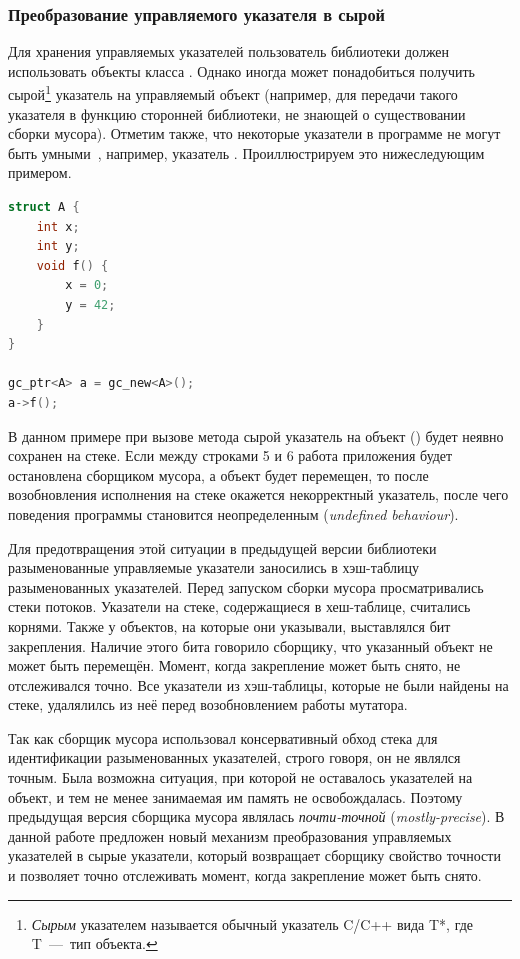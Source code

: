 \subsubsection{Преобразование управляемого указателя в сырой}
Для хранения управляемых указателей пользователь библиотеки должен использовать объекты 
класса . 
Однако иногда может понадобиться получить сырой\footnote{\emph{Сырым} 
указателем называется обычный указатель C/C++ вида T*, 
где T~---~тип объекта.} 
указатель на управляемый объект (например, для передачи такого указателя 
в функцию сторонней библиотеки, 
не знающей о существовании сборки мусора). 
Отметим также, что некоторые указатели в программе не могут быть 
умными~\cite{book:jones1996garbage}, например, указатель . 
Проиллюстрируем это нижеследующим примером.

\begin{minipage}{\linewidth}
\begin{lstlisting}[language={c++}, caption={Неявное разыменование 
	\code{gc\_ptr}}, label={code:this_example}]
struct A {
    int x;
    int y;
    void f() {
        x = 0;
        y = 42;
    }
}

gc_ptr<A> a = gc_new<A>();
a->f();
\end{lstlisting}
\end{minipage}

В данном примере при вызове метода  сырой указатель на объект 
 () будет неявно сохранен на стеке. 
Если между строками 5 и 6 работа приложения будет остановлена сборщиком мусора, а объект 
 будет перемещен, то после возобновления исполнения на стеке окажется некорректный 
указатель, после чего поведения программы становится неопределенным 
(\emph{undefined behaviour}). 

Для предотвращения этой ситуации в предыдущей версии библиотеки разыменованные управляемые 
указатели заносились в хэш-таблицу разыменованных указателей. 
Перед запуском сборки мусора просматривались стеки потоков. 
Указатели на стеке, содержащиеся в хеш-таблице, считались корнями. 
Также у объектов, на которые они указывали, выставлялся бит закрепления. 
Наличие этого бита говорило сборщику, что указанный объект не может быть перемещён. 
Момент, когда закрепление может быть снято, не отслеживался точно. 
Все указатели из хэш-таблицы, которые не были найдены на стеке, удалялилсь из неё перед 
возобновлением работы мутатора.

Так как сборщик мусора использовал консервативный обход стека для идентификации 
разыменованных указателей, строго говоря, он не являлся точным. 
Была возможна ситуация, при которой не оставалось указателей на объект, и тем не менее 
занимаемая им память не освобождалась. 
Поэтому предыдущая версия сборщика мусора являлась \emph{почти-точной} (\emph{mostly-precise}). 
В данной работе предложен новый механизм преобразования управляемых указателей в сырые 
указатели, который возвращает сборщику свойство точности и позволяет точно отслеживать 
момент, когда закрепление может быть снято.
